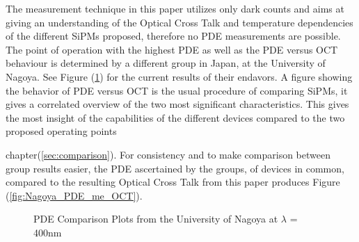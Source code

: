 \documentclass[12pt,article,type=msc,colorback,accentcolor=tud9c]{tudthesis}
\begin{document}
The measurement technique in this paper utilizes only dark counts and aims at giving an understanding of the Optical Cross Talk and temperature dependencies of the different SiPMs proposed, therefore no PDE measurements are possible. The point of operation with the highest PDE as well as the PDE versus OCT behaviour is determined by a different group in Japan, at the University of Nagoya. See Figure (\ref{fig:Nagoya_PDE}) for the current results of their endavors. A figure showing the behavior of PDE versus OCT is the usual procedure of comparing SiPMs, it gives a correlated overview of the two most significant characteristics. This gives the most insight of the capabilities of the different devices compared to the two proposed operating points {chapter(\ref{sec:comparison}). For consistency and to make comparison between group results easier, the PDE ascertained by the groups, of devices in common, compared to the resulting Optical Cross Talk from this paper produces Figure (\ref{fig:Nagoya_PDE_me_OCT}).\\

\begin{figure}[b!]
\begin{centering}
\caption{PDE Comparison Plots from the University of Nagoya at $\lambda$ = 400nm}
\label{fig:Nagoya_PDE}
\end{centering}
\end{figure}

}
\end{document}
